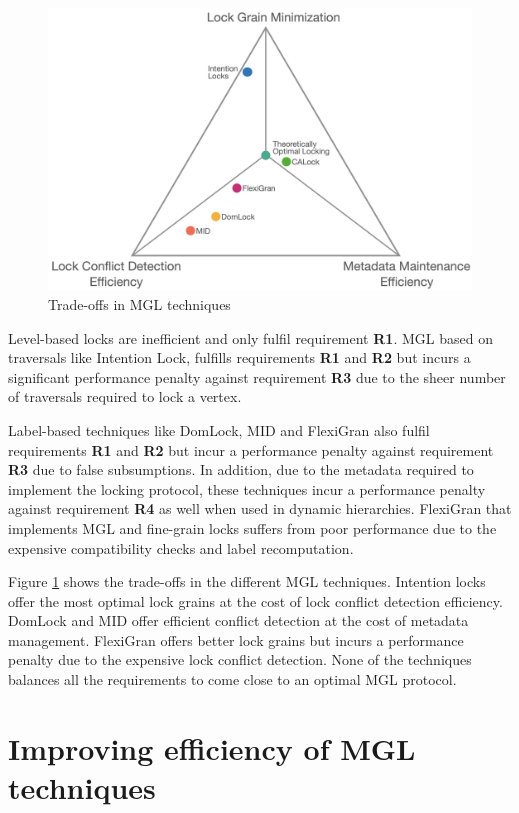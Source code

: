 \begin{figure}[h]
    \centering
    \captionsetup{justification=centering}
    \includegraphics[width=.9\textwidth]{figures/MGL_comparision.png}
    \caption{Trade-offs in MGL techniques}
    \label{fig:tradeoffs}
\end{figure}

Level-based locks are inefficient and only fulfil requirement \textbf{R1}. MGL based on traversals like Intention Lock, fulfills requirements \textbf{R1} and \textbf{R2} but incurs a significant performance penalty against requirement \textbf{R3} due to the sheer number of traversals required to lock a vertex.

Label-based techniques like DomLock, MID and FlexiGran also fulfil requirements \textbf{R1} and \textbf{R2} but incur a performance penalty against requirement \textbf{R3} due to false subsumptions. In addition, due to the metadata required to implement the locking protocol, these techniques incur a performance penalty against requirement \textbf{R4} as well when used in dynamic hierarchies. 
FlexiGran that implements MGL and fine-grain locks suffers from poor performance due to the expensive compatibility checks and label recomputation. 

Figure \ref{fig:tradeoffs} shows the trade-offs in the different MGL techniques. Intention locks offer the most optimal lock grains at the cost of lock conflict detection efficiency. DomLock and MID offer efficient conflict detection at the cost of metadata management. FlexiGran offers better lock grains but incurs a performance penalty due to the expensive lock conflict detection. None of the techniques balances all the requirements to come close to an optimal MGL protocol.


\section{Improving efficiency of MGL techniques}

